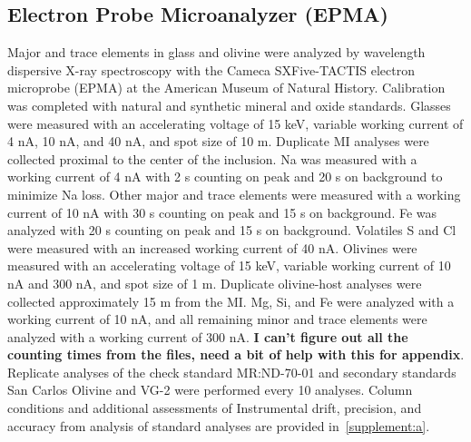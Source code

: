\documentclass[draft]{agujournal2019}
\begin{document}
\subsection{Electron Probe Microanalyzer (EPMA)}
Major and trace elements in glass and olivine were analyzed by wavelength dispersive X-ray spectroscopy with the Cameca SXFive-TACTIS electron microprobe (EPMA) at the American Museum of Natural History. Calibration was completed with natural and synthetic mineral and oxide standards. Glasses were measured with an accelerating voltage of 15 keV, variable working current of 4 nA, 10 nA, and 40 nA, and spot size of 10 \textmu m. Duplicate MI analyses were collected proximal to the center of the inclusion. Na was measured with a working current of 4 nA with 2 s counting on peak and 20 s on background to minimize Na loss. Other major and trace elements were measured with a working current of 10 nA with 30 s counting on peak and 15 s on background. Fe was analyzed with 20 s counting on peak and 15 s on background. Volatiles S and Cl were measured with an increased working current of 40 nA. Olivines were measured with an accelerating voltage of 15 keV, variable working current of 10 nA and 300 nA, and spot size of 1 \textmu m. Duplicate olivine-host analyses were collected approximately 15 \textmu m from the MI. Mg, Si, and Fe were analyzed with a working current of 10 nA, and all remaining minor and trace elements were analyzed with a working current of 300 nA. \textbf{I can't figure out all the counting times from the files, need a bit of help with this for appendix}. Replicate analyses of the check standard MR:ND-70-01 and secondary standards San Carlos Olivine and VG-2 were performed every 10 analyses. Column conditions and additional assessments of Instrumental drift, precision, and accuracy from analysis of standard analyses are provided in~\ref{supplement:a}. 

\end{document}
